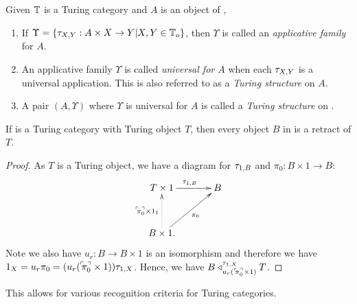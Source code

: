 \begin{definition}\label{def:turing_structure}
  Given $\mathbb{T}$ is a Turing category and $A$ is an object of \T,
  \begin{enumerate}
    \item If $\Upsilon=\{\tau_{{X},{Y}}: A\times X \to Y | X,Y \in \mathbb{T}_o\}$, then $\Upsilon$ is called an
      \emph{applicative family} for $A$.
    \item An applicative family $\Upsilon$ is called \emph{universal for $A$} when each $\tau_{{X},{Y}}$ is
      a universal application. This is also referred to as a \emph{Turing structure} on $A$.
    \item A pair $(A,\Upsilon)$ where $\Upsilon$ is universal for $A$ is called a \emph{Turing
      structure} on \T.
  \end{enumerate}
\end{definition}

\begin{lemma}\label{lem:turing_object_is_retractable}
  If \T is a Turing category with Turing object $T$, then every object $B$ in \T is a retract of
  $T$.
\end{lemma}
\begin{proof}
  As $T$ is a Turing object, we have a diagram for $\tau_{{1},{B}}$ and $\pi_0:B\times 1 \to B$:
  \[
    \xymatrix@C+10pt@R+10pt{
      T\times 1 \ar[r]^{\tur{1}{B}} & B \\
      B\times 1. \ar@{.>}[u]^{\name{\pi_0}\times 1_1} \ar[ur]_{\pi_0}
    }
  \]
  Note we also have $u_r:B\to B\times 1$ is an
  isomorphism and therefore we have $1_X = u_r \pi_0 = (u_r ({}^\ulcorner\!\!\pi_0^\urcorner\times 1)) \tau_{{1},{X}}$. Hence, we
  have $B \triangleleft_{u_r ({}^\ulcorner\!\!\pi_0^\urcorner\times 1)}^{\tau_{{1},{X}}} T$.
\end{proof}

This allows for various recognition criteria for Turing categories.

